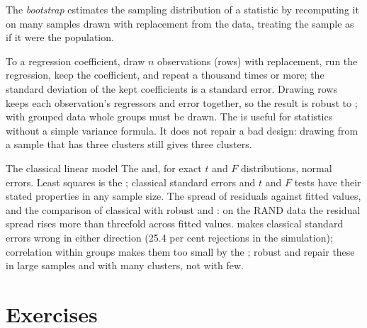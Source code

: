 \begin{definition}[Bootstrap]\label{def:b2:regression-inference:bootstrap}
The \emph{bootstrap} estimates the sampling distribution of a statistic by recomputing it on many samples
drawn with replacement from the data, treating the sample as if it were the population.
\end{definition}

To  a regression coefficient, draw $n$ observations (rows) with replacement, run the regression, keep the
coefficient, and repeat a thousand times or more; the standard deviation of the kept coefficients is a standard error.
Drawing rows keeps each observation's regressors and error together, so the result is robust to ; with
grouped data whole groups must be drawn. The  is useful for statistics without a simple variance formula. It does
not repair a bad design: drawing from a sample that has three clusters still gives three clusters.

\begin{model}{The classical linear model}
\assumes The  and, for exact $t$ and $F$ distributions, normal errors.
\predicts Least squares is the ; classical standard errors and $t$ and $F$ tests have their
stated properties in any sample size.
\tested The spread of residuals against fitted values, and the comparison of classical with robust and : on the RAND data the residual spread rises more than threefold across fitted values.
\breaks {} makes classical standard errors wrong in either direction (25.4 per cent rejections in the
simulation); correlation within groups makes them too small by the ; robust and  repair these in large samples and with many clusters, not with few.
\end{model}

\section{Exercises}\label{sec:b2:regression-inference:exercises}

